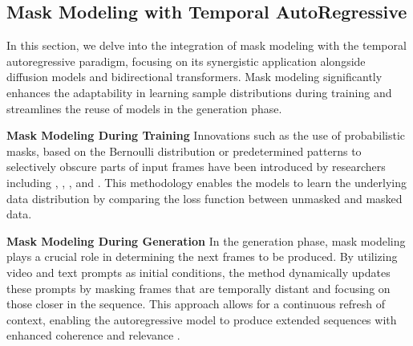 \documentclass{article}
\begin{document}
\subsection{Mask Modeling with Temporal AutoRegressive}
In this section, we delve into the integration of mask modeling with the temporal autoregressive paradigm, focusing on its synergistic application alongside diffusion models and bidirectional transformers. Mask modeling significantly enhances the adaptability in learning sample distributions during training and streamlines the reuse of models in the generation phase.


\noindent\textbf{Mask Modeling During Training} 
Innovations such as the use of probabilistic masks, based on the Bernoulli distribution or predetermined patterns to selectively obscure parts of input frames have been introduced by researchers including \cite{seine}, \cite{align}, \cite{Phenaki}, and \cite{MeBT}. This methodology enables the models to learn the underlying data distribution by comparing the loss function between unmasked and masked data.


\noindent\textbf{Mask Modeling During Generation} In the generation phase, mask modeling plays a crucial role in determining the next frames to be produced. By utilizing video and text prompts as initial conditions, the method dynamically updates these prompts by masking frames that are temporally distant and focusing on those closer in the sequence. This approach allows for a continuous refresh of context, enabling the autoregressive model to produce extended sequences with enhanced coherence and relevance \citep{Phenaki,MeBT}.
\end{document}

